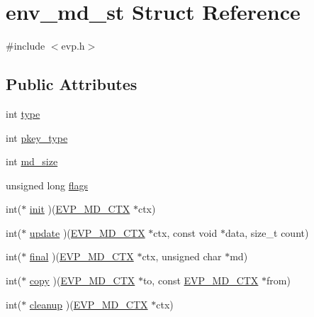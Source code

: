 \hypertarget{structenv__md__st}{}\section{env\+\_\+md\+\_\+st Struct Reference}
\label{structenv__md__st}


{\ttfamily \#include $<$evp.\+h$>$}

\subsection*{Public Attributes}
\begin{DoxyCompactItemize}
\item 
int \hyperlink{structenv__md__st_a23f72d7bf1652d69a85942f66f55df01}{type}
\item 
int \hyperlink{structenv__md__st_a30d9b3466b50542b6931476f0ecf2351}{pkey\+\_\+type}
\item 
int \hyperlink{structenv__md__st_a7de9719a79492ba980f18f546ff160cf}{md\+\_\+size}
\item 
unsigned long \hyperlink{structenv__md__st_a5096c8e255bb2b2100aeae4d50af2fcb}{flags}
\item 
int($\ast$ \hyperlink{structenv__md__st_afe1f83efe755ab7f5887ff46aa1269be}{init} )(\hyperlink{ossl__typ_8h_a69cda4d21bd068f01c469222c1dd92fe}{E\+V\+P\+\_\+\+M\+D\+\_\+\+C\+TX} $\ast$ctx)
\item 
int($\ast$ \hyperlink{structenv__md__st_a57339bd5446e71a0a827f12d8ba23e40}{update} )(\hyperlink{ossl__typ_8h_a69cda4d21bd068f01c469222c1dd92fe}{E\+V\+P\+\_\+\+M\+D\+\_\+\+C\+TX} $\ast$ctx, const void $\ast$data, size\+\_\+t count)
\item 
int($\ast$ \hyperlink{structenv__md__st_aa04a65c96264e232f926f2ddf03a5fd3}{final} )(\hyperlink{ossl__typ_8h_a69cda4d21bd068f01c469222c1dd92fe}{E\+V\+P\+\_\+\+M\+D\+\_\+\+C\+TX} $\ast$ctx, unsigned char $\ast$md)
\item 
int($\ast$ \hyperlink{structenv__md__st_ac616c2dbbb6a5b70cca668db44500840}{copy} )(\hyperlink{ossl__typ_8h_a69cda4d21bd068f01c469222c1dd92fe}{E\+V\+P\+\_\+\+M\+D\+\_\+\+C\+TX} $\ast$to, const \hyperlink{ossl__typ_8h_a69cda4d21bd068f01c469222c1dd92fe}{E\+V\+P\+\_\+\+M\+D\+\_\+\+C\+TX} $\ast$from)
\item 
int($\ast$ \hyperlink{structenv__md__st_acf24becb13e74703b0995ab0f310dc69}{cleanup} )(\hyperlink{ossl__typ_8h_a69cda4d21bd068f01c469222c1dd92fe}{E\+V\+P\+\_\+\+M\+D\+\_\+\+C\+TX} $\ast$ctx)
\item 

\end{DoxyCompactItemize}

